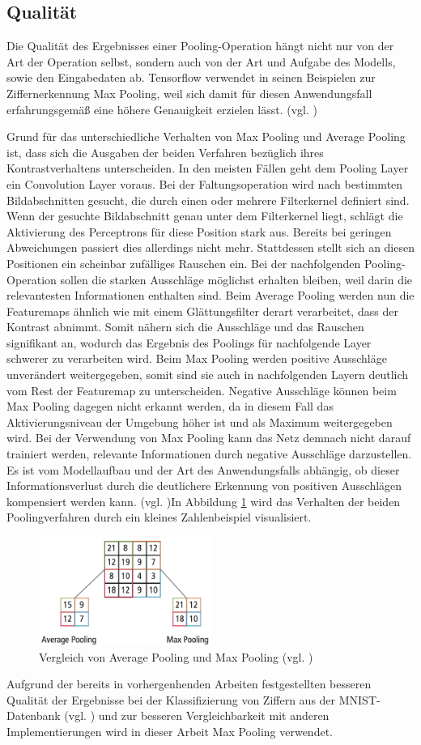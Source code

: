 \documentclass[../main.tex]{subfiles}
\begin{document}
\subsection{Qualität}
Die Qualität des Ergebnisses einer Pooling-Operation hängt nicht nur von der Art der Operation selbst, sondern auch von der Art und Aufgabe des Modells, sowie den Eingabedaten ab. Tensorflow verwendet in seinen Beispielen zur Ziffernerkennung Max Pooling, weil sich damit für diesen Anwendungsfall erfahrungsgemäß eine höhere Genauigkeit erzielen lässt. (vgl. \cite{tensorflowTutorial})

Grund für das unterschiedliche Verhalten von Max Pooling und Average Pooling ist, dass sich die Ausgaben der beiden Verfahren bezüglich ihres Kontrastverhaltens unterscheiden. In den meisten Fällen geht dem Pooling Layer ein Convolution Layer voraus. Bei der Faltungsoperation wird nach bestimmten Bildabschnitten gesucht, die durch einen oder mehrere Filterkernel definiert sind. Wenn der gesuchte Bildabschnitt genau unter dem Filterkernel liegt, schlägt die Aktivierung des Perceptrons für diese Position stark aus. Bereits bei geringen Abweichungen passiert dies allerdings nicht mehr. Stattdessen stellt sich an diesen Positionen ein scheinbar zufälliges Rauschen ein. Bei der nachfolgenden Pooling-Operation sollen die starken Ausschläge möglichst erhalten bleiben, weil darin die relevantesten Informationen enthalten sind. Beim Average Pooling werden nun die Featuremaps ähnlich wie mit einem Glättungsfilter derart verarbeitet, dass der Kontrast abnimmt. Somit nähern sich die Ausschläge und das Rauschen signifikant an, wodurch das Ergebnis des Poolings für nachfolgende Layer schwerer zu verarbeiten wird. Beim Max Pooling werden positive Ausschläge unverändert weitergegeben, somit sind sie auch in nachfolgenden Layern deutlich vom Rest der Featuremap zu unterscheiden. Negative Ausschläge können beim Max Pooling dagegen nicht erkannt werden, da in diesem Fall das Aktivierungsniveau der Umgebung höher ist und als Maximum weitergegeben wird. Bei der Verwendung von Max Pooling kann das Netz demnach nicht darauf trainiert werden, relevante Informationen durch negative Ausschläge darzustellen. Es ist vom Modellaufbau und der Art des Anwendungsfalls abhängig, ob dieser Informationsverlust durch die deutlichere Erkennung von positiven Ausschlägen kompensiert werden kann. (vgl. \cite{paperMixedPooling})In Abbildung \ref{pic:pooling_avg_max} wird das Verhalten der beiden Poolingverfahren durch ein kleines Zahlenbeispiel visualisiert. 
\begin{figure}
    \centering 
       \includegraphics[width=0.5\textwidth]{../images/Schmidt/pooling_avg_max.jpg} 
    \caption {Vergleich von Average Pooling und Max Pooling (vgl. \cite{articleCadenceCNN})} 
    \label{pic:pooling_avg_max} 
\end{figure} 
Aufgrund der bereits in vorhergenhenden Arbeiten festgestellten besseren Qualität der Ergebnisse bei der Klassifizierung von Ziffern aus der MNIST-Datenbank (vgl. \cite{tensorflowTutorial}) und zur besseren Vergleichbarkeit mit anderen Implementierungen wird in dieser Arbeit Max Pooling verwendet. 
\end{document}
